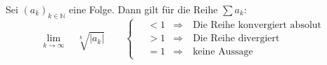 Sei $(a_k)_{k \in \mathbb{N}}$ eine Folge. Dann gilt für die Reihe $\sum a_k$:
$$
\lim_{k \to \infty} \quad \sqrt[k]{|a_k|} \qquad
\begin{cases}
    \quad < 1 & \Rightarrow \quad \text{Die Reihe konvergiert absolut} \\
    \quad > 1 & \Rightarrow \quad \text{Die Reihe divergiert} \\
    \quad = 1 & \Rightarrow \quad \text{keine Aussage}
\end{cases}
$$